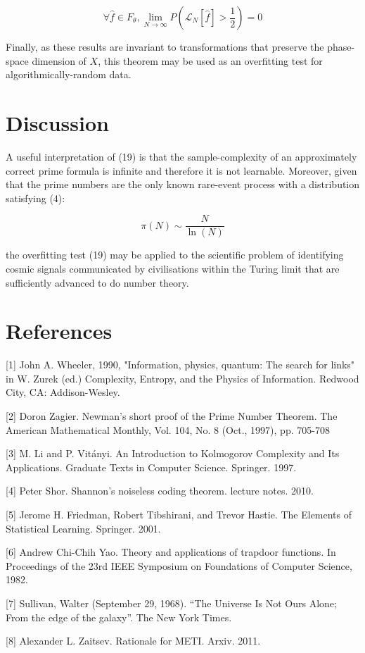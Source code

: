 \documentclass{article}
\begin{document}
\begin{equation}
\forall \hat{f} \in F_{\theta}, \lim_{N \to \infty} P(\mathcal{L}_N[\hat{f}] > \frac{1}{2}) = 0
\end{equation}

Finally, as these results are invariant to transformations that preserve the 
phase-space dimension of $X$, this theorem may be used as an overfitting test 
for algorithmically-random data. 

\newpage

\section{Discussion}

A useful interpretation of (19) is that the sample-complexity of an approximately correct prime formula is infinite and therefore it is not learnable. Moreover, given that the prime numbers are the only known rare-event process with a distribution satisfying (4): 

\begin{equation}
\pi(N) \sim \frac{N}{\ln(N)}	
\end{equation}

the overfitting test (19) may be applied to the scientific problem of identifying cosmic signals communicated by civilisations within the Turing limit that are 
sufficiently advanced to do number theory. 

\section*{References}

\small

[1] John A. Wheeler, 1990, "Information, physics, quantum: The search for links" in W. Zurek (ed.) Complexity, Entropy, and the Physics of Information. Redwood City, CA: Addison-Wesley.

[2] Doron Zagier. Newman’s short proof of the Prime Number Theorem. The American Mathematical Monthly, Vol. 104, No. 8 (Oct., 1997), pp. 705-708

[3] M. Li and P. Vitányi. An Introduction to Kolmogorov Complexity and Its Applications. Graduate Texts in Computer Science. Springer. 1997.

[4] Peter Shor. Shannon’s noiseless coding theorem. lecture notes. 2010.

[5] Jerome H. Friedman, Robert Tibshirani, and Trevor Hastie. The Elements of Statistical Learning. Springer. 2001.

[6] Andrew Chi-Chih Yao. Theory and applications of trapdoor functions. In Proceedings of the 23rd IEEE Symposium on Foundations of Computer Science, 1982.

[7] Sullivan, Walter (September 29, 1968). “The Universe Is Not Ours Alone; From the edge of the galaxy”. The New York Times.

[8] Alexander L. Zaitsev. Rationale for METI. Arxiv. 2011.
\end{document}
